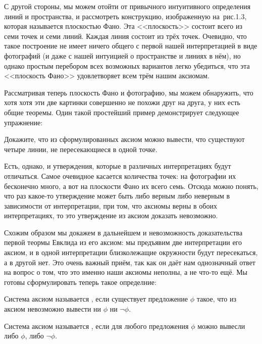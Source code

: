С другой стороны, мы можем отойти от привычного интуитивного определения линий и пространства, и рассмотреть конструкцию, изображенную на~рис.1.3, которая называется плоскостью Фано. Эта <<плоскость>> состоит всего из семи точек и семи линий. Каждая линия состоит из трёх точек. Очевидно, что такое построение не имеет ничего общего с первой нашей интерпретацией в виде фотографий (и даже с нашей интуицией о пространстве и линиях в нём), но однако простым перебором всех возможных вариантов легко убедиться, что эта <<плоскость Фано>> удовлетворяет всем трём нашим аксиомам.

Рассматривая теперь плоскость Фано и фотографию, мы можем обнаружить, что хотя хотя эти две картинки совершенно не похожи друг на друга, у них есть общие теоремы. Один такой простейший пример демонстрирует следующее упражнение:

\begin{exercise}
Докажите, что из сформулированных аксиом можно вывести, что существуют четыре линии, не пересекающиеся в одной точке.
\end{exercise}

Есть, однако, и утверждения, которые в различных интерпретациях будут отличаться. Самое очевидное касается количества точек: на фотографии их бесконечно много, а вот на плоскости Фано их всего семь. Отсюда можно понять, что раз какое-то утверждение может быть либо верным либо неверным в зависимости от интерпретации, при том, что аксиомы верны в обоих интерпретациях, то это утверждение из аксиом доказать невозможно.

Схожим образом мы докажем в дальнейшем и невозможность доказательства первой теормы Евклида из его аксиом: мы предъявим две интерпретации его аксиом, и в одной интерпретации близколежащие окружности будут пересекаться, а в другой нет. Это очень важный приём, так как он даёт нам однозначный ответ на вопрос о том, что это именно наши аксиомы неполны, а не что-то ещё. Мы готовы сформулировать теперь такое определние:

\begin{definition}
Система аксиом называется , если существует предложение $\phi$ такое, что из аксиом невозможно вывести ни $\phi$ ни $\neg\phi$.
\end{definition}

\begin{definition}
Система аксиом называется , если для любого предложения $\phi$ можно вывесли либо $\phi$, либо $\neg\phi$.
\end{definition}

